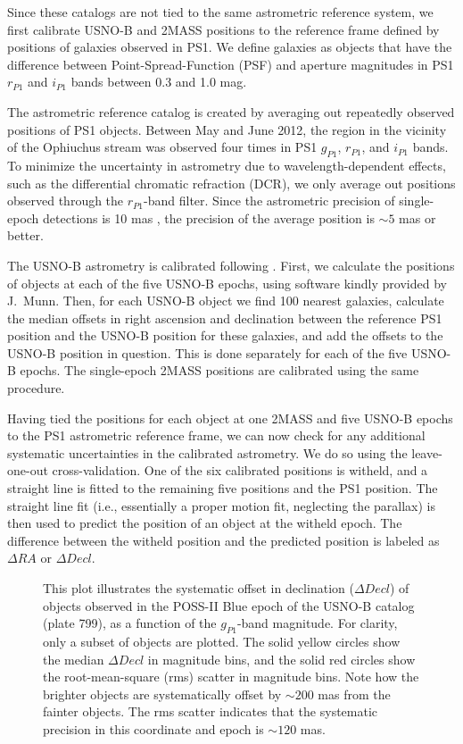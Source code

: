 \documentclass[iop]{emulateapj}
\begin{document}
Since these catalogs are not tied to the same astrometric reference system, we
first calibrate USNO-B and 2MASS positions to the reference frame defined by
positions of galaxies observed in PS1. We define galaxies as objects that have
the difference between Point-Spread-Function (PSF) and aperture magnitudes in
PS1 $r_{P1}$ and $i_{P1}$ bands between 0.3 and 1.0 mag.

The astrometric reference catalog is created by averaging out repeatedly
observed positions of PS1 objects. Between May and June 2012, the region in the
vicinity of the Ophiuchus stream was observed four times in PS1 $g_{P1}$,
$r_{P1}$, and $i_{P1}$ bands. To minimize the uncertainty in astrometry due to
wavelength-dependent effects, such as the differential chromatic refraction
(DCR), we only average out positions observed through the $r_{P1}$-band filter.
Since the astrometric precision of single-epoch detections is 10 mas
\citep{mag08}, the precision of the average position is $\sim5$ mas or better.

The USNO-B astrometry is calibrated following
\citet[see their Section 2.1]{mun04}. First, we calculate the positions
of objects at each of the five USNO-B epochs, using software kindly provided by
J.~Munn. Then, for each USNO-B object we find 100 nearest galaxies, calculate
the median offsets in right ascension and declination between the reference PS1
position and the USNO-B position for these galaxies, and add the offsets to the
USNO-B position in question. This is done separately for each of the five USNO-B
epochs. The single-epoch 2MASS positions are calibrated using the same
procedure.

Having tied the positions for each object at one 2MASS and five USNO-B epochs to
the PS1 astrometric reference frame, we can now check for any additional
systematic uncertainties in the calibrated astrometry. We do so using the
leave-one-out cross-validation. One of the six calibrated positions is witheld, 
and a straight line is fitted to the remaining five positions and the PS1
position. The straight line fit (i.e., essentially a proper motion fit,
neglecting the parallax) is then used to predict the position of an object at
the witheld epoch. The difference between the witheld position and the predicted
position is labeled as $\Delta RA$ or $\Delta Decl$.

\begin{figure}
\caption{
This plot illustrates the systematic offset in declination ($\Delta Decl$) of
objects observed in the POSS-II Blue epoch of the USNO-B catalog (plate 799), as
a function of the $g_{P1}$-band magnitude. For clarity, only a subset of objects
are plotted. The solid yellow circles show the median $\Delta Decl$ in magnitude
bins, and the solid red circles show the root-mean-square (rms) scatter in
magnitude bins. Note how the brighter objects are systematically offset by
$\sim200$ mas from the fainter objects. The rms scatter indicates that the
systematic precision in this coordinate and epoch is $\sim120$ mas.
\label{usnob_crossvalidation}}
\end{figure}
\end{document}
